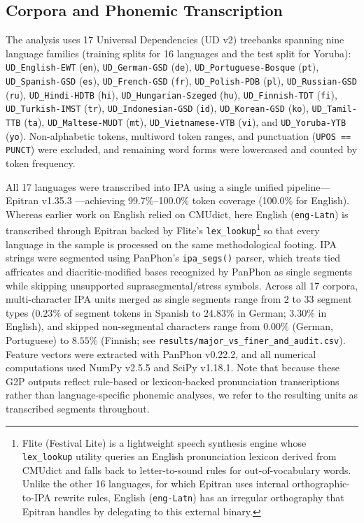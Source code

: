 \documentclass[11pt,a4paper,leqno]{article}
\begin{document}
\subsection{Corpora and Phonemic Transcription}
The analysis uses 17 Universal Dependencies (UD v2) treebanks \citep{nivre2020universal} spanning nine language families (training splits for 16 languages and the test split for Yoruba): \texttt{UD\_English-EWT} (\texttt{en}), \texttt{UD\_German-GSD} (\texttt{de}), \texttt{UD\_Portuguese-Bosque} (\texttt{pt}), \texttt{UD\_Spanish-GSD} (\texttt{es}), \texttt{UD\_French-GSD} (\texttt{fr}), \texttt{UD\_Polish-PDB} (\texttt{pl}), \texttt{UD\_Russian-GSD} (\texttt{ru}), \texttt{UD\_Hindi-HDTB} (\texttt{hi}), \texttt{UD\_Hungarian-Szeged} (\texttt{hu}), \texttt{UD\_Finnish-TDT} (\texttt{fi}), \texttt{UD\_Turkish-IMST} (\texttt{tr}), \texttt{UD\_Indonesian-GSD} (\texttt{id}), \texttt{UD\_Korean-GSD} (\texttt{ko}), \texttt{UD\_Tamil-TTB} (\texttt{ta}), \texttt{UD\_Maltese-MUDT} (\texttt{mt}), \texttt{UD\_Vietnamese-VTB} (\texttt{vi}), and \texttt{UD\_Yoruba-YTB} (\texttt{yo}). Non-alphabetic tokens, multiword token ranges, and punctuation (\texttt{UPOS == PUNCT}) were excluded, and remaining word forms were lowercased and counted by token frequency.

All 17 languages were transcribed into IPA using a single unified pipeline---Epitran v1.35.3 \citep{mortensen2018epitran}---achieving 99.7\%--100.0\% token coverage (100.0\% for English). Whereas earlier work on English \citep{araujo2013thesis} relied on CMUdict, here English (\texttt{eng-Latn}) is transcribed through Epitran backed by Flite's \texttt{lex\_lookup}\footnote{Flite (Festival Lite) is a lightweight speech synthesis engine whose \texttt{lex\_lookup} utility queries an English pronunciation lexicon derived from CMUdict and falls back to letter-to-sound rules for out-of-vocabulary words. Unlike the other 16 languages, for which Epitran uses internal orthographic-to-IPA rewrite rules, English (\texttt{eng-Latn}) has an irregular orthography that Epitran handles by delegating to this external binary.} so that every language in the sample is processed on the same methodological footing. IPA strings were segmented using PanPhon's \texttt{ipa\_segs()} parser, which treats tied affricates and diacritic-modified bases recognized by PanPhon as single segments while skipping unsupported suprasegmental/stress symbols. Across all 17 corpora, multi-character IPA units merged as single segments range from $2$ to $33$ segment types ($0.23\%$ of segment tokens in Spanish to $24.83\%$ in German; $3.30\%$ in English), and skipped non-segmental characters range from $0.00\%$ (German, Portuguese) to $8.55\%$ (Finnish; see \texttt{results/major\_vs\_finer\_and\_audit.csv}). Feature vectors were extracted with PanPhon v0.22.2, and all numerical computations used NumPy v2.5.5 and SciPy v1.18.1. Note that because these G2P outputs reflect rule-based or lexicon-backed pronunciation transcriptions rather than language-specific phonemic analyses, we refer to the resulting units as transcribed segments throughout.
\end{document}
